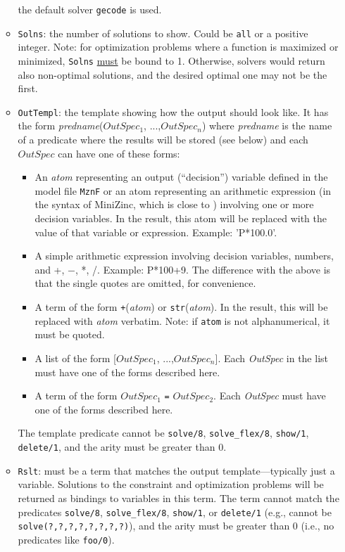 \begin{itemize}
\begin{itemize}
    the default solver \texttt{gecode} is used. 
  \item \texttt{Solns}: the number of solutions to show. 
    Could be \texttt{all} or a positive integer.
    Note: for optimization problems where a function is maximized or minimized,
    \texttt{Solns} \underline{must} be bound to 1. Otherwise, solvers would
    return also non-optimal solutions, and the desired optimal one may not
    be the first.
  \item \texttt{OutTempl}: the template showing how the output should look
    like. It has the form \emph{predname}($OutSpec_1$, ...,$OutSpec_n$)
    where \emph{predname} is the name of a predicate
    where the results will be stored (see below)
    and each $OutSpec$ can have one of these forms:
    \begin{itemize}
    \item  An \emph{atom} representing an output (``decision'') variable
      defined in the model file \texttt{MznF} or an atom representing an
      arithmetic expression (in the syntax of MiniZinc, which is close to
      \FLSYSTEM) involving one or more decision variables.
      In the result, this atom will be replaced with the value of that
      variable or expression. Example: 'P*100.0'.
    \item A simple arithmetic expression involving decision variables,
      numbers, and +, $-$, *, /.  Example: P*100+9. The difference with the
      above is that the single quotes are omitted, for convenience.
    \item  A term of the form \texttt{+}(\emph{atom}) or
      \texttt{str}(\emph{atom}).  In the result, this will be replaced with
      \emph{atom} verbatim. Note: if \texttt{atom} is not alphanumerical,
      it must be quoted.

    \item A list of the form [$OutSpec_1$, ...,$OutSpec_n$]. Each
      \emph{OutSpec} in the list must have one of the forms
      described here.
    \item A term of the form $OutSpec_1$ \texttt{=} $OutSpec_2$. Each
      \emph{OutSpec} must have one of the forms
      described here.
    \end{itemize}
    The template predicate cannot be \texttt{solve/8}, \texttt{solve\_flex/8},
    \texttt{show/1}, \texttt{delete/1},  
    and the arity must be greater than 0.  
  \item \texttt{Rslt}: must be a term that matches the output
    template---typically just a variable.  Solutions to the constraint and
    optimization problems will be returned as bindings to variables in this
    term.  The term cannot match the predicates \texttt{solve/8},
    \texttt{solve\_flex/8}, \texttt{show/1}, or \texttt{delete/1} (e.g.,
    cannot be \texttt{solve(?,?,?,?,?,?,?,?)}), and the arity must
    be greater than 0 (i.e., no predicates like \texttt{foo/0}).


\end{itemize}
\end{itemize}
